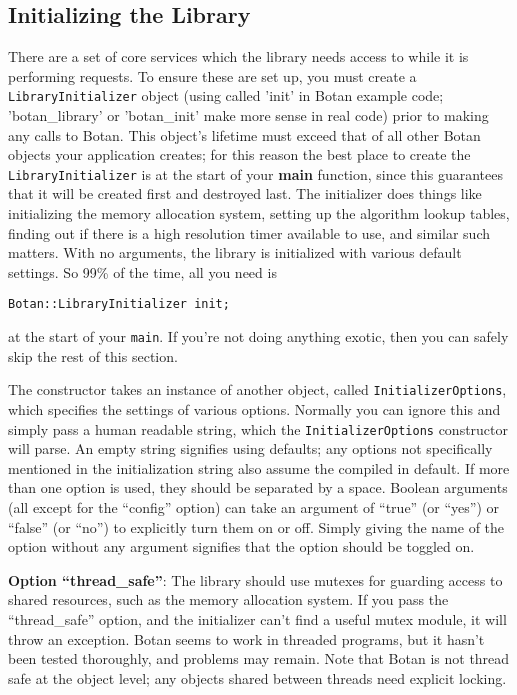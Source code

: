 \documentclass{article}
\newcommand{\function}[1]{\textbf{#1}}
\newcommand{\type}[1]{\texttt{#1}}
\begin{document}
\subsection{Initializing the Library}

There are a set of core services which the library needs access to
while it is performing requests. To ensure these are set up, you must
create a \type{LibraryInitializer} object (using called 'init' in
Botan example code; 'botan\_library' or 'botan\_init' make more sense
in real code) prior to making any calls to Botan. This object's
lifetime must exceed that of all other Botan objects your application
creates; for this reason the best place to create the
\type{LibraryInitializer} is at the start of your \function{main}
function, since this guarantees that it will be created first and
destroyed last. The initializer does things like initializing the
memory allocation system, setting up the algorithm lookup tables,
finding out if there is a high resolution timer available to use, and
similar such matters. With no arguments, the library is initialized
with various default settings. So 99\% of the time, all you need is

\texttt{Botan::LibraryInitializer init;}

at the start of your \texttt{main}. If you're not doing anything
exotic, then you can safely skip the rest of this section.

The constructor takes an instance of another object, called
\type{InitializerOptions}, which specifies the settings of various
options. Normally you can ignore this and simply pass a human readable
string, which the \type{InitializerOptions} constructor will parse. An
empty string signifies using defaults; any options not specifically
mentioned in the initialization string also assume the compiled in
default.
If more than one option is used, they should be separated by a
space. Boolean arguments (all except for the ``config'' option) can
take an argument of ``true'' (or ``yes'') or ``false'' (or ``no'') to
explicitly turn them on or off. Simply giving the name of the option
without any argument signifies that the option should be toggled on.

\newcommand{\option}[1]{\noindent \textbf{Option ``#1''}}

\option{thread\_safe}: The library should use mutexes for guarding
access to shared resources, such as the memory allocation system. If you pass
the ``thread\_safe'' option, and the initializer can't find a useful mutex
module, it will throw an exception. Botan seems to work in threaded programs,
but it hasn't been tested thoroughly, and problems may remain. Note that Botan
is not thread safe at the object level; any objects shared between threads need
explicit locking.
\end{document}
